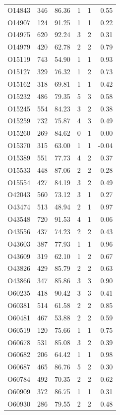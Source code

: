 \begin{longtable}{lrrrrr}
O14843 & 346 & 86.36 & 1 & 1 & 0.55 \\
O14907 & 124 & 91.25 & 1 & 1 & 0.22 \\
O14975 & 620 & 92.24 & 3 & 2 & 0.31 \\
O14979 & 420 & 62.78 & 2 & 2 & 0.79 \\
O15119 & 743 & 54.90 & 1 & 1 & 0.93 \\
O15127 & 329 & 76.32 & 1 & 2 & 0.73 \\
O15162 & 318 & 69.81 & 1 & 1 & 0.42 \\
O15232 & 486 & 79.35 & 5 & 3 & 0.58 \\
O15245 & 554 & 84.23 & 3 & 2 & 0.38 \\
O15259 & 732 & 75.87 & 4 & 3 & 0.49 \\
O15260 & 269 & 84.62 & 0 & 1 & 0.00 \\
O15370 & 315 & 63.00 & 1 & 1 & -0.04 \\
O15389 & 551 & 77.73 & 4 & 2 & 0.37 \\
O15533 & 448 & 87.06 & 2 & 2 & 0.28 \\
O15554 & 427 & 84.19 & 3 & 2 & 0.49 \\
O42043 & 560 & 73.12 & 3 & 1 & 0.27 \\
O43474 & 513 & 48.94 & 2 & 1 & 0.97 \\
O43548 & 720 & 91.53 & 4 & 1 & 0.06 \\
O43556 & 437 & 74.23 & 2 & 2 & 0.43 \\
O43603 & 387 & 77.93 & 1 & 1 & 0.96 \\
O43609 & 319 & 62.10 & 1 & 2 & 0.67 \\
O43826 & 429 & 85.79 & 2 & 2 & 0.63 \\
O43866 & 347 & 85.86 & 3 & 3 & 0.90 \\
O60235 & 418 & 90.42 & 3 & 3 & 0.41 \\
O60381 & 514 & 61.58 & 2 & 2 & 0.85 \\
O60481 & 467 & 53.88 & 2 & 2 & 0.59 \\
O60519 & 120 & 75.66 & 1 & 1 & 0.75 \\
O60678 & 531 & 85.08 & 3 & 2 & 0.39 \\
O60682 & 206 & 64.42 & 1 & 1 & 0.98 \\
O60687 & 465 & 86.76 & 5 & 2 & 0.30 \\
O60784 & 492 & 70.35 & 2 & 2 & 0.62 \\
O60909 & 372 & 86.75 & 1 & 1 & 0.31 \\
O60930 & 286 & 79.55 & 2 & 2 & 0.48 \\

\end{longtable}
